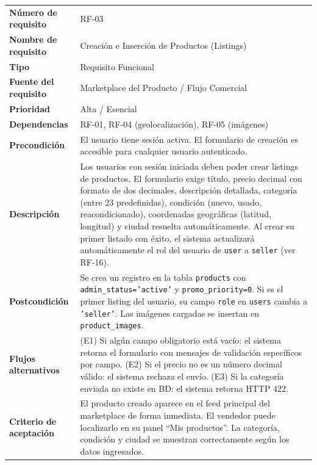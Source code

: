\documentclass[11pt,a4paper]{report}
\begin{document}
\begin{table}[H]
\centering
\begin{tabularx}{\textwidth}{|l|L|}
\hline
{} \\ \hline
\textbf{Número de requisito} & RF-03 \\ \hline
\textbf{Nombre de requisito} & Creación e Inserción de Productos (Listings) \\ \hline
\textbf{Tipo} & Requisito Funcional \\ \hline
\textbf{Fuente del requisito} & Marketplace del Producto / Flujo Comercial \\ \hline
\textbf{Prioridad} & Alta / Esencial \\ \hline
\textbf{Dependencias} & RF-01, RF-04 (geolocalización), RF-05 (imágenes) \\ \hline
\textbf{Precondición} & El usuario tiene sesión activa. El formulario de creación es accesible para cualquier usuario autenticado. \\ \hline
\textbf{Descripción} & Los usuarios con sesión iniciada deben poder crear listings de productos. El formulario exige título, precio decimal con formato de dos decimales, descripción detallada, categoría (entre 23 predefinidas), condición (nuevo, usado, reacondicionado), coordenadas geográficas (latitud, longitud) y ciudad resuelta automáticamente. Al crear su primer listado con éxito, el sistema actualizará automáticamente el rol del usuario de \texttt{user} a \texttt{seller} (ver RF-16). \\ \hline
\textbf{Postcondición} & Se crea un registro en la tabla \texttt{products} con \texttt{admin\_status='active'} y \texttt{promo\_priority=0}. Si es el primer listing del usuario, su campo \texttt{role} en \texttt{users} cambia a \texttt{'seller'}. Las imágenes cargadas se insertan en \texttt{product\_images}. \\ \hline
\textbf{Flujos alternativos} & (E1) Si algún campo obligatorio está vacío: el sistema retorna el formulario con mensajes de validación específicos por campo. (E2) Si el precio no es un número decimal válido: el sistema rechaza el envío. (E3) Si la categoría enviada no existe en BD: el sistema retorna HTTP 422. \\ \hline
\textbf{Criterio de aceptación} & El producto creado aparece en el feed principal del marketplace de forma inmediata. El vendedor puede localizarlo en su panel ``Mis productos''. La categoría, condición y ciudad se muestran correctamente según los datos ingresados. \\ \hline
\end{tabularx}
\end{table}
\end{document}
